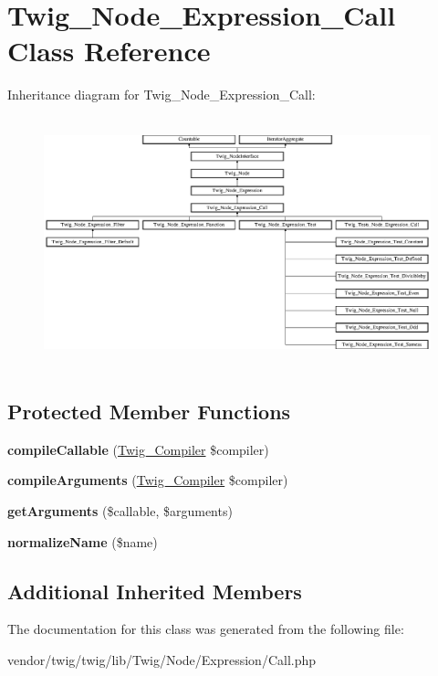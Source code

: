 \hypertarget{classTwig__Node__Expression__Call}{}\section{Twig\+\_\+\+Node\+\_\+\+Expression\+\_\+\+Call Class Reference}
\label{classTwig__Node__Expression__Call}
Inheritance diagram for Twig\+\_\+\+Node\+\_\+\+Expression\+\_\+\+Call\+:\begin{figure}[H]
\begin{center}
\leavevmode
\includegraphics[height=7.250996cm]{classTwig__Node__Expression__Call}
\end{center}
\end{figure}
\subsection*{Protected Member Functions}
\begin{DoxyCompactItemize}
\item 
{\bfseries compile\+Callable} (\hyperlink{classTwig__Compiler}{Twig\+\_\+\+Compiler} \$compiler)\hypertarget{classTwig__Node__Expression__Call_a09802bf89a6f901aa642a9648c23abbe}{}\label{classTwig__Node__Expression__Call_a09802bf89a6f901aa642a9648c23abbe}

\item 
{\bfseries compile\+Arguments} (\hyperlink{classTwig__Compiler}{Twig\+\_\+\+Compiler} \$compiler)\hypertarget{classTwig__Node__Expression__Call_a89d3a1e40cba5cbd87fd17fba79187e6}{}\label{classTwig__Node__Expression__Call_a89d3a1e40cba5cbd87fd17fba79187e6}

\item 
{\bfseries get\+Arguments} (\$callable, \$arguments)\hypertarget{classTwig__Node__Expression__Call_a9537fe8ab78f596479600f4609df619e}{}\label{classTwig__Node__Expression__Call_a9537fe8ab78f596479600f4609df619e}

\item 
{\bfseries normalize\+Name} (\$name)\hypertarget{classTwig__Node__Expression__Call_a9c07c64bec7d968523efa1cfa78dbe6d}{}\label{classTwig__Node__Expression__Call_a9c07c64bec7d968523efa1cfa78dbe6d}

\end{DoxyCompactItemize}
\subsection*{Additional Inherited Members}


The documentation for this class was generated from the following file\+:\begin{DoxyCompactItemize}
\item 
vendor/twig/twig/lib/\+Twig/\+Node/\+Expression/Call.\+php\end{DoxyCompactItemize}
